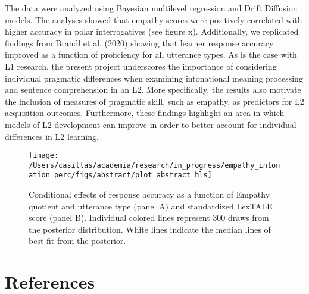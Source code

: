 \documentclass[
  11pt,
]{article}
\begin{document}
The data were analyzed using Bayesian multilevel regression and Drift
Diffusion models. The analyses showed that empathy scores were
positively correlated with higher accuracy in polar interrogatives (see
figure x). Additionally, we replicated findings from Brandl et al.
(2020) showing that learner response accuracy improved as a function of
proficiency for all utterance types. As is the case with L1 research,
the present project underscores the importance of considering individual
pragmatic differences when examining intonational meaning processing and
sentence comprehension in an L2. More specifically, the results also
motivate the inclusion of measures of pragmatic skill, such as empathy,
as predictors for L2 acquisition outcomes. Furthermore, these findings
highlight an area in which models of L2 development can improve in order
to better account for individual differences in L2 learning.

\clearpage

\begin{figure}
\texttt{[image: /Users/casillas/academia/research/in\_progress/empathy\_intonation\_perc/figs/abstract/plot\_abstract\_hls]} \caption{Conditional effects of response accuracy as a function of Empathy 
quotient and utterance type (panel A) and standardized LexTALE score (panel B). 
Individual colored lines represent 300 draws from the posterior distribution. White lines indicate the median lines of best fit from the posterior.}\label{fig:plot-2afc-3way}
\end{figure}

\hypertarget{references}{%
\section{References}\label{references}}

\begingroup
\setlength{\parindent}{-0.5in}
\setlength{\leftskip}{0.5in}

\phantom{.}

\textcolor{white}{\\} \vspace{-0.5in}
\end{document}
